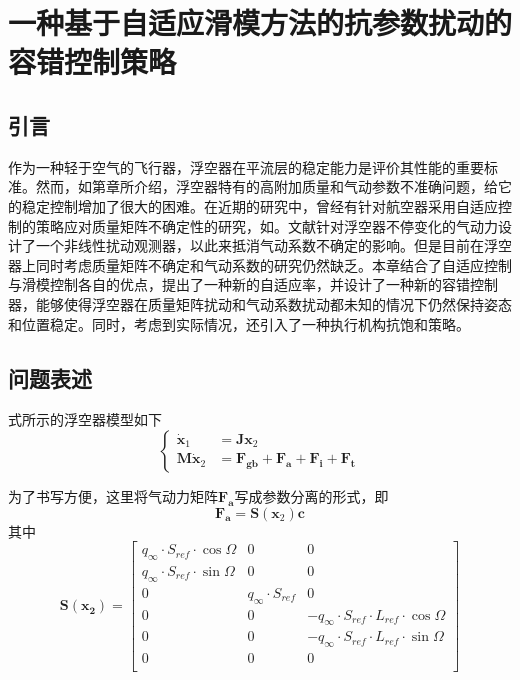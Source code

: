
\chapter{一种基于自适应滑模方法的抗参数扰动的容错控制策略}
\label{chap:asmcsat}
\section{引言}
作为一种轻于空气的飞行器，浮空器在平流层的稳定能力是评价其性能的重要标准。然而，如第章所介绍，浮空器特有的高附加质量和气动参数不准确问题，给它的稳定控制增加了很大的困难。在近期的研究中，曾经有针对航空器采用自适应控制的策略应对质量矩阵不确定性的研究，如\cite{7061535}。文献\cite{7978124}针对浮空器不停变化的气动力设计了一个非线性扰动观测器，以此来抵消气动系数不确定的影响。但是目前在浮空器上同时考虑质量矩阵不确定和气动系数的研究仍然缺乏。本章结合了自适应控制与滑模控制各自的优点，提出了一种新的自适应率，并设计了一种新的容错控制器，能够使得浮空器在质量矩阵扰动和气动系数扰动都未知的情况下仍然保持姿态和位置稳定。同时，考虑到实际情况，还引入了一种执行机构抗饱和策略。

\section{问题表述}
式所示的浮空器模型如下
\begin{equation*}
    \begin{cases}
    \dot{\mathbf{x}}_1 &= \mathbf{J}\mathbf{x}_2 \\
    \mathbf{M}\dot{\mathbf{x}}_2 &= \mathbf{F_{gb}} + \mathbf{F_a} + \mathbf{F_i} + \mathbf{F_t}
    \end{cases}
\end{equation*}

为了书写方便，这里将气动力矩阵$\mathbf{F_a}$写成参数分离的形式，即
\begin{equation}\label{eq:Fa-para}
    \mathbf{F_a} = \mathbf{S}(\mathbf{x}_2)\mathbf{c}
\end{equation}
其中
\begin{equation}\label{eq:Sx2}
\mathbf{S(x_2)}=\left[
\begin{matrix}
q_\infty\cdot S_{ref}\cdot\cos\Omega&0&0 \\
q_\infty\cdot S_{ref}\cdot\sin\Omega&0&0  \\
0&q_\infty\cdot S_{ref}&0  \\
0&0&-q_\infty\cdot S_{ref}\cdot L_{ref}\cdot \cos\Omega  \\
0&0&-q_\infty\cdot S_{ref}\cdot L_{ref}\cdot \sin\Omega  \\
0&0&0  \\
\end{matrix}
\right]
\end{equation}

